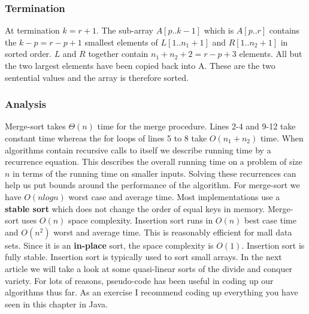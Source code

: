 \documentclass[10pt,a4paper]{article}
\begin{document}
\subsubsection{Termination}
At termination $k=r+1$. The sub-array $A[p..k-1]$ which is $A[p..r]$ contains the $k-p=r-p+1$ smallest elements of $L[1..n_1+1]$ and $R[1..n_2+1]$ in sorted order. $L$ and $R$ together contain $n_1+n_2+2=r-p+3$ elements. All but the two largest elements have been copied back into A. These are the two sentential values and the array is therefore sorted.
\subsubsection{Analysis}
Merge-sort takes $\Theta(n)$ time for the merge procedure. Lines 2-4 and 9-12 take constant time whereas the for loops of lines 5 to 8 take $O(n_1+n_2)$ time. When algorithms contain recursive calls to itself we describe running time by a recurrence equation. This describes the overall running time on a problem of size $n$ in terms of the running time on smaller inputs. Solving these recurrences can help us put bounds around the performance of the algorithm. For merge-sort we have $O(n log n)$ worst case and average time. Most implementations use a {\bf stable sort} which does not change the order of equal keys in memory. Merge-sort uses $O(n)$ space complexity. 
\newline\newline
Insertion sort runs in $O(n)$ best case time and $O(n^2)$ worst and average time. This is reasonably efficient for mall data sets. Since it is an {\bf in-place} sort, the space complexity is $O(1)$. Insertion sort is fully stable. Insertion sort is typically used to sort small arrays. 
\newline\newline
In the next article we will take a look at some quasi-linear sorts of the divide and conquer variety. For lots of reasons, pseudo-code has been useful in coding up our algorithms thus far. As an exercise I recommend coding up everything you have seen in this chapter in Java.
{}

\begin{center}
\end{center}
\end{document}
